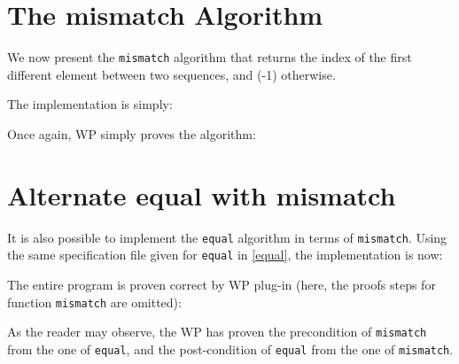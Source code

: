 \clearpage
\section{The \textsf{mismatch} Algorithm}

We now present the \texttt{mismatch} algorithm that returns the index
of the first different element between two sequences, and (-1) otherwise.


The implementation is simply:


Once again, \textsf{WP} simply proves the algorithm:

\clearpage
\section{Alternate \textsf{equal} with \textsf{mismatch}}

It is also possible to implement the \texttt{equal} algorithm in terms
of \texttt{mismatch}. Using the same specification file given for
\texttt{equal} in \ref{equal}, the implementation is now:


The entire program is proven correct by \textsf{WP} plug-in (here,
the proofs steps for function \texttt{mismatch} are omitted):

As the reader may observe, the \textsf{WP} has proven the precondition
of \texttt{mismatch} from the one of \texttt{equal}, and the
post-condition of \texttt{equal} from the one of \texttt{mismatch}.
